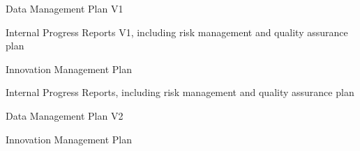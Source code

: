 \begin{workpackage}
\begin{wpdelivs}
\begin{wpdeliv}[due=6,miles=startup,id=data-plan1,dissem=PU,nature=R,lead=PS]{Data Management Plan V1}
\end{wpdeliv}

\begin{wpdeliv}[due=12,miles=startup,lead=PS,
id=ipr,dissem=CO,nature=R]{Internal Progress Reports V1, including risk management and quality assurance plan}
\end{wpdeliv}

\begin{wpdeliv}[due=18,miles=proto1,lead=PS,
id=tickets,dissem=CO,nature=R]{Innovation Management Plan}
\end{wpdeliv}

\begin{wpdeliv}[due=36,miles=community,miles=proto1,lead=PS,
id=ipr2,dissem=CO,nature=R]{Internal Progress Reports, including risk management and quality assurance plan}
\end{wpdeliv}
\begin{wpdeliv}[due=36,miles=community,id=data-plan3,dissem=PU,nature=R,lead=PS]{Data Management Plan V2}
\end{wpdeliv}

\begin{wpdeliv}[due=45,lead=PS,miles=eval,
id=tickets,dissem=CO,nature=R]{Innovation Management Plan}
\end{wpdeliv}




\end{wpdelivs}
\end{workpackage}

